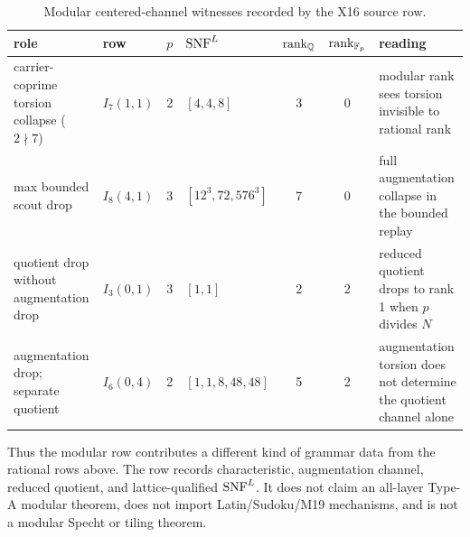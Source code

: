 \begin{table}[!htbp]
\centering
\caption{Modular centered-channel witnesses recorded by the X16 source row.}
\label{tab:modular-channel-witnesses}
\scriptsize
\setlength{\tabcolsep}{2pt}
\renewcommand{\arraystretch}{0.92}
\begin{tabular}{@{}L{0.18\textwidth}L{0.14\textwidth}cL{0.16\textwidth}ccL{0.24\textwidth}@{}}
\toprule
role & row & \(p\) & \(\operatorname{SNF}^{L}\) & \(\operatorname{rank}_{\mathbb Q}\) & \(\operatorname{rank}_{\mathbb F_p}\) & reading \\
\midrule
carrier-coprime torsion collapse (\(2\nmid7\)) & \(I_7(1,1)\) & 2 & \([4,4,8]\) & 3 & 0 & modular rank sees torsion invisible to rational rank \\
max bounded scout drop & \(I_8(4,1)\) & 3 & \([12^3,72,576^3]\) & 7 & 0 & full augmentation collapse in the bounded replay \\
quotient drop without augmentation drop & \(I_3(0,1)\) & 3 & \([1,1]\) & 2 & 2 & reduced quotient drops to rank 1 when \(p\) divides \(N\) \\
augmentation drop; separate quotient & \(I_6(0,4)\) & 2 & \([1,1,8,48,48]\) & 5 & 2 & augmentation torsion does not determine the quotient channel alone \\\bottomrule
\end{tabular}
\end{table}

Thus the modular row contributes a different kind of grammar data from the rational rows above.  The row records characteristic, augmentation channel, reduced quotient, and lattice-qualified \(\operatorname{SNF}^{L}\).  It does not claim an all-layer Type-A modular theorem, does not import Latin/Sudoku/M19 mechanisms, and is not a modular Specht or tiling theorem.